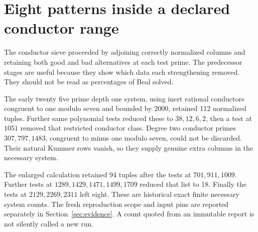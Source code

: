\section{Eight patterns inside a declared conductor range}\label{sec:patterns}
The conductor sieve proceeded by adjoining correctly normalized columns and retaining both good and bad alternatives at each test prime. The predecessor stages are useful because they show which data each strengthening removed. They should not be read as percentages of Beal solved.

The early twenty five prime depth one system, using inert rational conductors congruent to one modulo seven and bounded by 2000, retained 112 normalized tuples. Further same polynomial tests reduced these to $38,12,6,2$, then a test at $1051$ removed that restricted conductor class. Degree two conductor primes $307,797,1483$, congruent to minus one modulo seven, could not be discarded. Their natural Kummer rows vanish, so they supply genuine extra columns in the necessary system.

The enlarged calculation retained 94 tuples after the tests at $701,911,1009$. Further tests at $1289,1429,1471,1499,1709$ reduced that list to 18. Finally the tests at $2129,2269,2311$ left eight. These are historical exact finite necessary system counts. The fresh reproduction scope and input pins are reported separately in Section~\ref{sec:evidence}. A count quoted from an immutable report is not silently called a new run.

